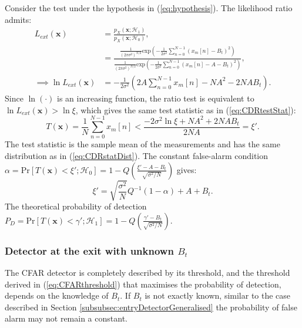 \documentclass[11pt]{article}
\newcommand{\bx}{\mathbf{x}}
\newcommand{\cH}{\mathcal{H}}
\newcommand{\Prob}{\mathrm{Pr}}
\begin{document}
Consider the test under the hypothesis in (\ref{eq:hypothesis}). The likelihood ratio admits:
\begin{equation}
\begin{split}
	L_{ext}(\bx) &= \frac{p_{X}(\bx; \cH_{1})}{p_{X}(\bx; \cH_{0})}, \\
&= \frac{\frac{1}{(2\pi\sigma^{2})^{N/2}} \mathrm{exp}\left(-\frac{1}{2\sigma^{2}} \sum_{n=0}^{N-1} (x_{m}[n] - B_{t})^{2} \right)}{\frac{1}{(2\pi\sigma^{2})^{N/2}} \mathrm{exp}\left(-\frac{1}{2\sigma^{2}} \sum_{n=0}^{N-1} (x_{m}[n] - A - B_{t})^{2} \right)}, \\
\implies \ln L_{ext}(\bx) &= -\frac{1}{2\sigma^{2}} \left( 2A \sum_{n=0}^{N-1}x_{m}[n] - NA^{2} - 2NAB_{t} \right).
\end{split}
\label{eq:CDRlnTest}
\end{equation}
Since $\ln(\cdot)$ is an increasing function, the ratio test is equivalent to $\ln L_{ext}(\bx) > \ln\xi$, which gives the same test statistic as in (\ref{eq:CDRtestStat}):
\begin{equation}
	T(\bx) = \frac{1}{N} \sum_{n=0}^{N-1}x_{m}[n] < \frac{-2\sigma^{2}\ln\xi + NA^{2} + 2NAB_{t}}{2NA} = \xi'.
\label{eq:CFARtestStat}
\end{equation}
The test statistic is the sample mean of the measurements and has the same distribution as in (\ref{eq:CDRstatDist}). The constant false-alarm condition $\displaystyle \alpha = \Prob[T(\bx) < \xi';\cH_{0}] = 1-Q\left( \frac{\xi'-A-B_{t}}{\sqrt{\sigma^{2}/N}} \right)$ gives:
\begin{equation}
	\xi' = \sqrt{\frac{\sigma^{2}}{N}} Q^{-1}(1-\alpha) + A + B_{t}.
\label{eq:CFARthreshold}
\end{equation}
The theoretical probability of detection $\displaystyle P_{D} = \Prob[T(\bx) < \gamma';\cH_{1}] = 1-Q\left( \frac{\gamma'-B_{t}}{\sqrt{\sigma^{2}/N}} \right)$.


\subsubsection{Detector at the exit with unknown $B_{t}$}
\label{subsubsec:exitDetectorGeneralised}

The CFAR detector is completely described by its threshold, and the threshold derived in (\ref{eq:CFARthreshold}) that maximises the probability of detection, depends on the knowledge of $B_{t}$. If $B_{t}$ is not exactly known, similar to the case described in Section \ref{subsubsec:entryDetectorGeneralised} the probability of false alarm may not remain a constant.
\end{document}
